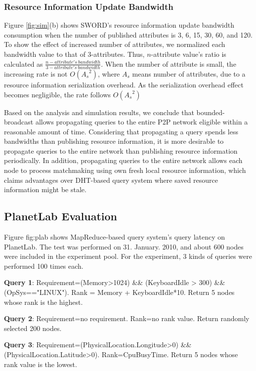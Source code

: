 \documentclass{acm_proc_article-sp}
\begin{document}
\subsubsection{Resource Information Update Bandwidth}
Figure \ref{fig:sim}(b) shows SWORD's resource information update bandwidth consumption when the number of published attributes is 3, 6, 15, 30, 60, and 120. 
To show the effect of increased number of attributes, we normalized each bandwidth value to that of 3-attributes.
Thus, $n$-attribute value's ratio is calculated as \begin{math}\frac{n-attribute's\ bandwidth}{3-attribute's\ bandwidth}\end{math}. 
When the number of attribute is small, the increasing rate is not $O({A_s}^2)$, where ${A_s}$ means number of attributes, due to a resource information serialization overhead.
As the serialization overhead effect becomes negligible, the rate follows $O({A_s}^2)$

Based on the analysis and simulation results, we conclude that bounded-broadcast allows propagating queries to the entire P2P network eligible within a reasonable amount of time.
Considering that propagating a query spends less bandwidths than publishing resource information, it is more desirable to propagate queries to the entire network than publishing resource information periodically. 
In addition, propagating queries to the entire network allows each node to process matchmaking using own fresh local resource information, 
which claims advantages over DHT-based query system where saved resource information might be stale.

\subsection{PlanetLab Evaluation}
Figure {fig:plab} shows MapReduce-based query system's query latency on PlanetLab. The test was performed on 31. January. 2010, and about 600 nodes were included in the experiment pool.
For the experiment, 3 kinds of queries were performed 100 times each. 

\textbf{Query 1}: Requirement=(Memory>1024) \&\& (KeyboardIdle > 300) \&\& (OpSys=="LINUX"). Rank = Memory + KeyboardIdle*10. Return 5 nodes whose rank is the highest.

\textbf{Query 2}: Requirement=no requirement. Rank=no rank value. Return randomly selected 200 nodes. 

\textbf{Query 3}: Requirement=(PhysicalLocation.Longitude>0) \&\& (PhysicalLocation.Latitude>0). Rank=CpuBusyTime. Return 5 nodes whose rank value is the lowest.
\end{document}
